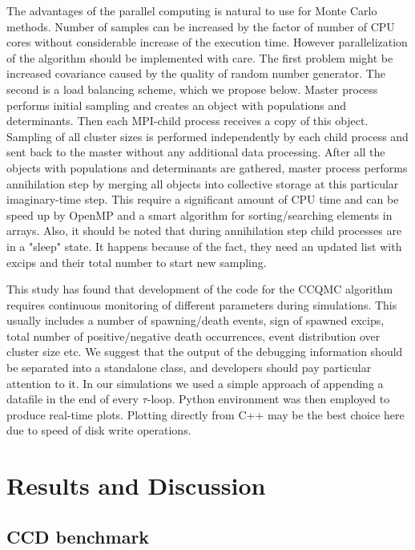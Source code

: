 \documentclass[twoside,english]{uiofysmaster}
\begin{document}
The advantages of the parallel computing is natural to use for Monte
Carlo methods. Number of samples can be increased by the factor of
number of CPU cores without considerable increase of the execution
time. However parallelization of the algorithm should be implemented
with care. The first problem might be increased covariance caused by
the quality of random number generator. The second is a load balancing
scheme, which we propose below.  Master process performs initial
sampling and creates an object with populations and determinants. Then
each MPI-child process receives a copy of this object. Sampling of all
cluster sizes is performed independently by each child process and
sent back to the master without any additional data processing.  After
all the objects with populations and determinants are gathered, master
process performs annihilation step by merging all objects into
collective storage at this particular imaginary-time step. This
require a significant amount of CPU time and can be speed up by OpenMP
and a smart algorithm for sorting/searching elements in arrays.  Also,
it should be noted that during annihilation step child processes are
in a "sleep" state. It happens because of the fact, they need an
updated list with excips and their total number to start new sampling.

This study has found that development of the code for the CCQMC
algorithm requires continuous monitoring of different parameters
during simulations. This usually includes a number of spawning/death
events, sign of spawned excips, total number of positive/negative
death occurrences, event distribution over cluster size etc.  We
suggest that the output of the debugging information should be separated into a
standalone class, and developers should pay particular attention to
it. In our simulations we used a simple approach of appending a
datafile in the end of every $\tau$-loop. Python environment was then
employed to produce real-time plots. Plotting directly from C++ may be
the best choice here due to speed of disk write operations.

\chapter{Results and Discussion}






\section{CCD benchmark}
\end{document}
